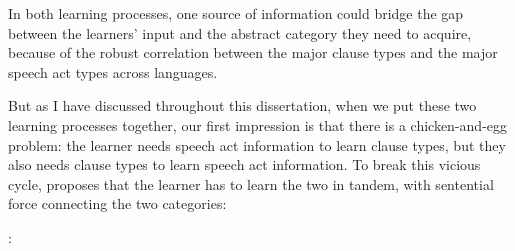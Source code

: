 In both learning processes, one source of information could bridge the gap between the learners' input and the abstract category they need to acquire, because of the robust correlation between the major clause types and the major speech act types across languages. 

But as I have discussed throughout this dissertation, when we put these two learning processes together, our first impression is that there is a chicken-and-egg problem: the learner needs speech act information to learn clause types, but they also needs clause types to learn speech act information. To break this vicious cycle, \hypos{} proposes that the learner has to learn the two in tandem, with sentential force connecting the two categories:

\begin{exe}\ex\label{ex:prag-syn-hypo}
:\\
\end{exe} 

\begin{comment}


\bex{}
\ex
\begin{tikzpicture}[level distance=60pt]
\tikzset{every tree node/.style={align=center,anchor=north, font=\scriptsize}}
\tikzset{level 1/.style={level distance=35pt}}
\tikzset{level 2/.style={sibling distance=35pt}}
\Tree
[. {Sentential force} 
	[. {Clause type features\\ ([\textpm int, imp])} 
		[. {Surface formal features} ]
		[. {Prosodic features} ]
	]
	[. {Speech act categories \\
	\aqrs{}} 
		
		[. {Prosodic features} ]
		[. {Social pragmatic features} ]
	]
]

\end{tikzpicture}
\eex
\end{comment}


